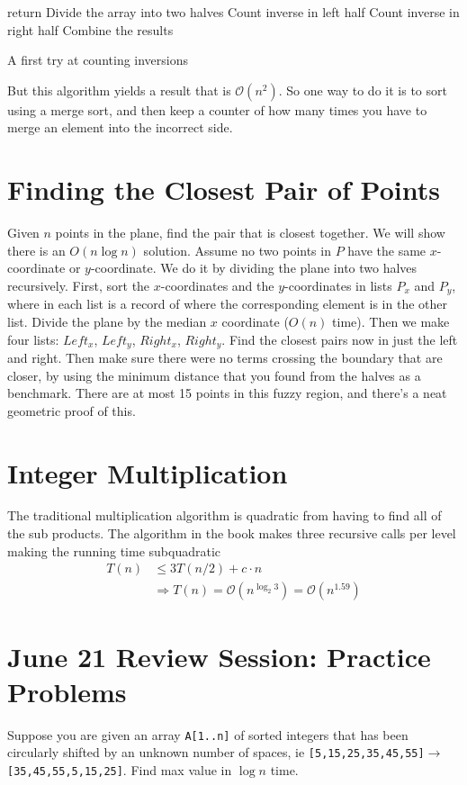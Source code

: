 \documentclass[11pt,letterpaper]{article}
\begin{document}
\begin{algorithm}[h]
	{return\;}
	Divide the array into two halves\;
	Count inverse in left half\;
	Count inverse in right half\;
	Combine the results\;
	\caption{A first try at counting inversions}
\end{algorithm}
But this algorithm yields a result that is $\mathcal{O}(n^2)$. So one way to do it is to sort using a merge sort, and then keep a counter of how many times you have to merge an element into the incorrect side.

\section{Finding the Closest Pair of Points}
Given $n$ points in the plane, find the pair that is closest together. We will show there is an $O(n \log n)$ solution. Assume no two points in $P$ have the same $x$-coordinate or $y$-coordinate. We do it by dividing the plane into two halves recursively. First, sort the $x$-coordinates and the $y$-coordinates in lists $P_x$ and $P_y$, where in each list is a record of where the corresponding element is in the other list. Divide the plane by the median $x$ coordinate ($O(n)$ time). Then we make four lists: $Left_x$, $Left_y$, $Right_x$, $Right_y$. Find the closest pairs now in just the left and right. Then make sure there were no terms crossing the boundary that are closer, by using the minimum distance that you found from the halves as a benchmark. There are at most 15 points in this fuzzy region, and there's a neat geometric proof of this. 

\section{Integer Multiplication}
The traditional multiplication algorithm is quadratic from having to find all of the sub products. The algorithm in the book makes three recursive calls per level making the running time subquadratic
\begin{align*}
	T(n) &\leq 3 T(n/2) + c\cdot n \\
	&\Rightarrow T(n) = \mathcal{O}(n^{\log_2 3}) = \mathcal{O}(n^{1.59})
\end{align*}

\section{June 21 Review Session: Practice Problems}
Suppose you are given an array \texttt{A[1..n]} of sorted integers that has been circularly shifted by an unknown number of spaces, ie \texttt{[5,15,25,35,45,55]}$\to$\texttt{[35,45,55,5,15,25]}. Find max value in $\log n$ time.
\end{document}
